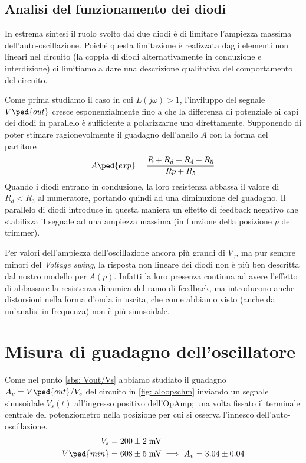 \documentclass[10pt, a4paper, italian]{article}
\begin{document}
\subsection{Analisi del funzionamento dei diodi}
In estrema sintesi il ruolo svolto dai due diodi è di limitare l'ampiezza
massima dell'auto-oscillazione. Poiché questa limitazione è realizzata dagli
elementi non lineari nel circuito (la coppia di diodi alternativamente in
conduzione e interdizione) ci limitiamo a dare una descrizione qualitativa del comportamento del circuito.

Come prima studiamo il caso in cui $L(j\omega) > 1$, l'inviluppo del segnale
$V\ped{out}$ cresce esponenzialmente fino a che la differenza di potenziale
ai capi dei diodi in parallelo è sufficiente a polarizzarne uno direttamente.
Supponendo di poter stimare ragionevolmente il guadagno dell'anello $A$ con la
forma del partitore
\[
A\ped{exp} = \frac{R + R_d + R_4 + R_5}{Rp + R_5}
\]
Quando i diodi entrano in conduzione, la loro resistenza abbassa il valore di
$R_d < R_3$ al numeratore, portando quindi ad una diminuzione del guadagno.
Il parallelo di diodi introduce in questa maniera un effetto di feedback
negativo che stabilizza il segnale ad una ampiezza massima (in funzione della
posizione $p$ del trimmer).

Per valori dell'ampiezza dell'oscillazione ancora più grandi di $V_\gamma$, ma
pur sempre minori del \emph{Voltage swing}, la risposta non lineare dei diodi
non è più ben descritta dal nostro modello per $A(p)$. Infatti la loro
presenza continua ad avere l'effetto di abbassare la resistenza dinamica del
ramo di feedback, ma introducono anche distorsioni nella forma d'onda in
uscita, che come abbiamo visto (anche da un'analisi in frequenza) non è più
sinusoidale.

\section{Misura di guadagno dell'oscillatore}
Come nel punto \ref{sbs: Vout/Vs} abbiamo studiato il guadagno
$A_v = V\ped{out}/V_s$ del circuito in \ref{fig: aloopschm} inviando un
segnale sinusoidale $V_s (t)$ all'ingresso positivo dell'OpAmp; una volta
fissato il terminale centrale del potenziometro nella posizione per cui si
osserva l'innesco dell'auto-oscillazione.
\begin{align*}
V_s &= 200 \pm 2 \; \si{m\V} \\
V\ped{min} &= 608 \pm 5 \; \si{m\V} \implies  A_v = 3.04 \pm 0.04
\end{align*}
\end{document}

